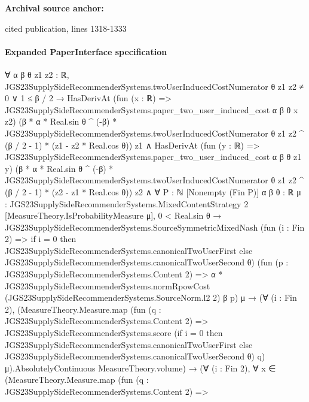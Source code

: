 \documentclass[10pt]{article}
\begin{document}
\textbf{Archival source anchor:} {\footnotesize\raggedright cited publication, lines 1318-\allowbreak{}1333\par}
\paragraph{Expanded PaperInterface specification}
\begin{ReviewVerbatim}
∀ {α β θ z1 z2 : ℝ},
  JGS23SupplySideRecommenderSystems.twoUserInducedCostNumerator θ z1 z2 ≠ 0 ∨ 1 ≤ β / 2 →
    HasDerivAt (fun (x : ℝ) => JGS23SupplySideRecommenderSystems.paper_two_user_induced_cost α β θ x z2)
        (β * α * Real.sin θ ^ (-β) *
            JGS23SupplySideRecommenderSystems.twoUserInducedCostNumerator θ z1 z2 ^ (β / 2 - 1) *
          (z1 - z2 * Real.cos θ))
        z1 ∧
      HasDerivAt (fun (y : ℝ) => JGS23SupplySideRecommenderSystems.paper_two_user_induced_cost α β θ z1 y)
          (β * α * Real.sin θ ^ (-β) *
              JGS23SupplySideRecommenderSystems.twoUserInducedCostNumerator θ z1 z2 ^ (β / 2 - 1) *
            (z2 - z1 * Real.cos θ))
          z2 ∧
        ∀ {P : ℕ} [Nonempty (Fin P)] {α β θ : ℝ} {μ : JGS23SupplySideRecommenderSystems.MixedContentStrategy 2}
          [MeasureTheory.IsProbabilityMeasure μ],
          0 < Real.sin θ →
            JGS23SupplySideRecommenderSystems.SourceSymmetricMixedNash
                (fun (i : Fin 2) =>
                  if i = 0 then JGS23SupplySideRecommenderSystems.canonicalTwoUserFirst
                  else JGS23SupplySideRecommenderSystems.canonicalTwoUserSecond θ)
                (fun (p : JGS23SupplySideRecommenderSystems.Content 2) =>
                  α *
                    JGS23SupplySideRecommenderSystems.normRpowCost (JGS23SupplySideRecommenderSystems.SourceNorm.l2 2) β
                      p)
                μ →
              (∀ (i : Fin 2),
                  (MeasureTheory.Measure.map
                        (fun (q : JGS23SupplySideRecommenderSystems.Content 2) =>
                          JGS23SupplySideRecommenderSystems.score
                            (if i = 0 then JGS23SupplySideRecommenderSystems.canonicalTwoUserFirst
                            else JGS23SupplySideRecommenderSystems.canonicalTwoUserSecond θ)
                            q)
                        μ).AbsolutelyContinuous
                    MeasureTheory.volume) →
                (∀ (i : Fin 2),
                    ∀
                      x ∈
                        (MeasureTheory.Measure.map
                            (fun (q : JGS23SupplySideRecommenderSystems.Content 2) =>

\end{ReviewVerbatim}
\end{document}
